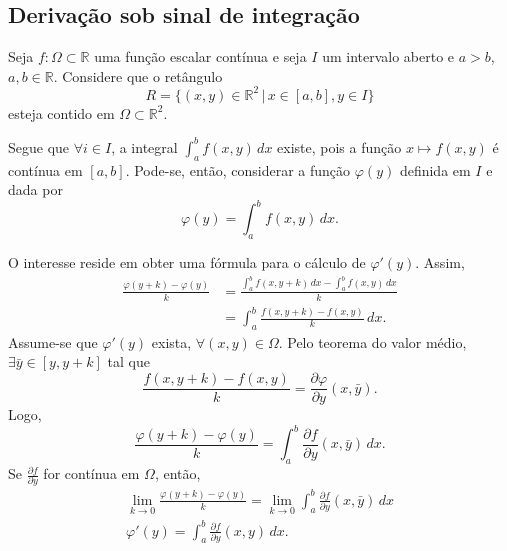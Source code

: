 \documentclass[11pt]{article}
\theoremstyle{definition}
\begin{document}
	\subsection{Derivação sob sinal de integração}
	
	Seja $f:\Omega\subset \mathbb{R}$ uma função escalar contínua e seja $I$ um intervalo aberto e $a>b$, $a,b\in\mathbb{R}$. Considere que o retângulo
	\begin{equation*}
		R=\{(x,y)\in\mathbb{R}^2\,|\, x\in[a,b],y\in I\}
	\end{equation*}
	esteja contido em $\Omega\subset \mathbb{R}^2$.
	
	Segue que $\forall i\in I$, a integral $\int_{a}^{b} f(x,y)\, dx$ existe, pois a função $x\mapsto f(x,y)$ é contínua em $[a,b]$. Pode-se, então, considerar a função $\varphi(y)$ definida em $I$ e dada por
	\begin{equation*}
		\varphi(y)=\int_{a}^{b}f(x,y)\, dx.
	\end{equation*}
	
	O interesse reside em obter uma fórmula para o cálculo de $\varphi'(y)$. Assim,
	\begin{align*}
		\frac{\varphi(y+k)-\varphi(y)}{k}&=\frac{\int_{a}^{b}f(x,y+k)\,dx-\int_{a}^{b}f(x,y)\, dx}{k}\\
		&=\int_{a}^{b}\frac{f(x,y+k)-f(x,y)}{k}\,dx.
	\end{align*}
	Assume-se que $\varphi'(y)$ exista, $\forall(x,y)\in \Omega$. Pelo teorema do valor médio, $\exists\bar{y}\in [y,y+k]$ tal que
	\begin{equation*}
		\frac{f(x,y+k)-f(x,y)}{k}=\frac{\partial \varphi}{\partial y}(x,\bar{y}).
	\end{equation*}
	Logo,
	\begin{equation*}
		\frac{\varphi(y+k)-\varphi(y)}{k}=\int_{a}^{b}\frac{\partial f}{\partial y}(x,\bar{y})\,dx.
	\end{equation*}
	Se $\frac{\partial f}{\partial y}$ for contínua em $\Omega$, então,
	\begin{gather*}
		\lim_{k\to 0}\frac{\varphi(y+k)-\varphi(y)}{k}=\lim_{k\to 0}\int_{a}^{b}\frac{\partial f}{\partial y}(x,\bar{y})\,dx\\
		\varphi'(y)=\int_{a}^{b}\frac{\partial f}{\partial y}(x,y)\,dx.
	\end{gather*}
\end{document}
